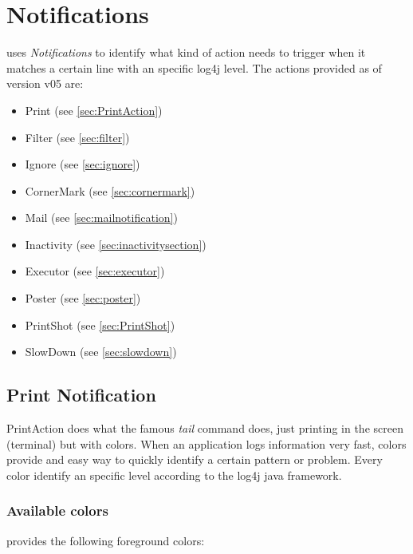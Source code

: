\section{Notifications}
\logftailer{} uses \emph{Notifications} to identify what kind of action needs to
trigger when it matches a certain line with an specific log4j level. The actions
provided as of version v05 are:
\begin{itemize}
 \item Print (see \autoref{sec:PrintAction})
 \item Filter (see \autoref{sec:filter})
 \item Ignore (see \autoref{sec:ignore})
 \item CornerMark (see \autoref{sec:cornermark})
 \item Mail (see \autoref{sec:mailnotification})
 \item Inactivity (see \autoref{sec:inactivitysection})
 \item Executor (see \autoref{sec:executor})
 \item Poster (see \autoref{sec:poster})
 \item PrintShot (see \autoref{sec:PrintShot})
 \item SlowDown (see \autoref{sec:slowdown})
\end{itemize}

\subsection{Print Notification}
\label{sec:PrintAction}
PrintAction does what the famous \emph{tail} command does, just printing in the
screen (terminal) but with colors. When an application logs information very
fast, colors provide and easy way to quickly identify a certain pattern or
problem. Every color identify an specific level according to the log4j java
framework.

\subsubsection{Available colors}
\label{sec:availablecolors}
\logftailer{} provides the following foreground colors:

